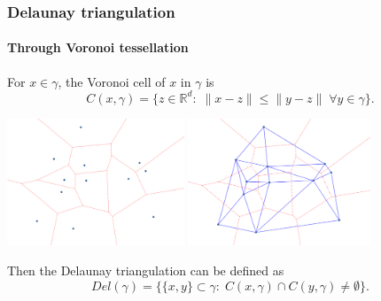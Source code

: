 \documentclass[c, 10pt]{beamer}
\begin{document}
\begin{frame}\frametitle{Delaunay triangulation}\framesubtitle{Through Voronoi tessellation}

For $x \in \gamma$, the \alert{Voronoi cell} of $x$ in $\gamma$ is
$$C(x,\gamma) = \{z \in \mathbb R^d:\; \|x-z\| \leq \|y-z\| \; \forall y \in \gamma \}.$$
\begin{centering}\includegraphics[height = 3.8cm]{./FigureLayout/Voronoi.png}
\includegraphics[height = 3.8cm]{./FigureLayout/VoronoiDel.png}\end{centering}
\vspace{3mm}

Then the Delaunay triangulation can be defined as 
$$Del(\gamma) = \{ \{x,y\} \subset \gamma: \; C(x,\gamma)\cap C(y,\gamma) \neq \emptyset \}.$$
\end{frame}
\end{document}
